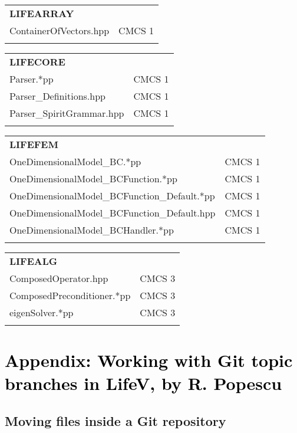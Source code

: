 \documentclass[10p]{article}
\newcommand{\newpartsVC}[1]{\textcolor{black}{#1}}
\theoremstyle{definition}
\begin{document}
\begin{landscape}
\begin{table}[!h]
\begin{multicols}{3}
\begin{xtabular}{
p{0.36\textwidth}<{}|
p{0.10\textwidth}<{}
}
\textbf{LIFEARRAY} \\
ContainerOfVectors.hpp & CMCS 1\\
& \\
\end{xtabular}
\begin{xtabular}{
p{0.36\textwidth}<{}|
p{0.1\textwidth}<{}
}
\textbf{LIFECORE} \\
Parser.*pp & CMCS 1\\
Parser\_Definitions.hpp & CMCS 1\\
Parser\_SpiritGrammar.hpp & CMCS 1\\
& \\
\end{xtabular}
\begin{xtabular}{
p{0.36\textwidth}<{}|
p{0.1\textwidth}<{}
}
\textbf{LIFEFEM} \\
OneDimensionalModel\_BC.*pp & CMCS 1\\
OneDimensionalModel\_BCFunction.*pp & CMCS 1\\
OneDimensionalModel\_BCFunction\_Default.*pp & CMCS 1\\
OneDimensionalModel\_BCFunction\_Default.hpp & CMCS 1\\
OneDimensionalModel\_BCHandler.*pp & CMCS 1\\
& \\
\end{xtabular}
\begin{xtabular}{
p{0.36\textwidth}<{}|
p{0.10\textwidth}<{}
}
\textbf{LIFEALG} \\
ComposedOperator.hpp & CMCS 3\\
ComposedPreconditioner.*pp & CMCS 3\\
eigenSolver.*pp & CMCS 3\\
& \\
\end{xtabular}
\end{multicols}
\normalsize\selectfont
\end{table}
\end{landscape}


\newpage
\section*{\newpartsVC{Appendix: Working with Git topic branches in LifeV, by R. Popescu}}

\subsection*{Moving files inside a Git repository}
\end{document}

